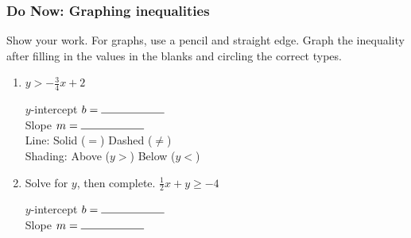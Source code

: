 \documentclass[12pt, twoside]{article}
\begin{document}
\subsubsection*{Do Now: Graphing inequalities}
Show your work. For graphs, use a pencil and straight edge. Graph the inequality after filling in the values in the blanks and circling the correct types.
  \begin{enumerate}

    \item $\displaystyle y > -\frac{3}{4} x +2 $

        \vspace{0.25cm}
        \begin{multicols}{2}
          $y$-intercept $b= \rule{2cm}{0.15mm}$ \\[0.5cm]
          Slope \hspace{0.7cm} $m= \rule{2cm}{0.15mm}$\\[0.5cm]

          Line: \hspace{1cm} Solid ($=$) \hspace{0.5cm} Dashed ($\neq$)\\[0.5cm]
          Shading: \hspace{0.3cm} Above ($y>$) \hspace{0.25cm} Below ($y<$)\\
        \end{multicols}

      \begin{center} %
      \end{center}

    \item Solve for $y$, then complete. $\displaystyle \frac{1}{2} x+ y \geq -4 $

        \vspace{3cm}
        \begin{multicols}{2}
          \raggedcolumns
          $y$-intercept $b= \rule{2cm}{0.15mm}$ \\[0.5cm]
          Slope \hspace{0.7cm} $m= \rule{2cm}{0.15mm}$\\


\end{multicols}
\end{enumerate}
\end{document}
